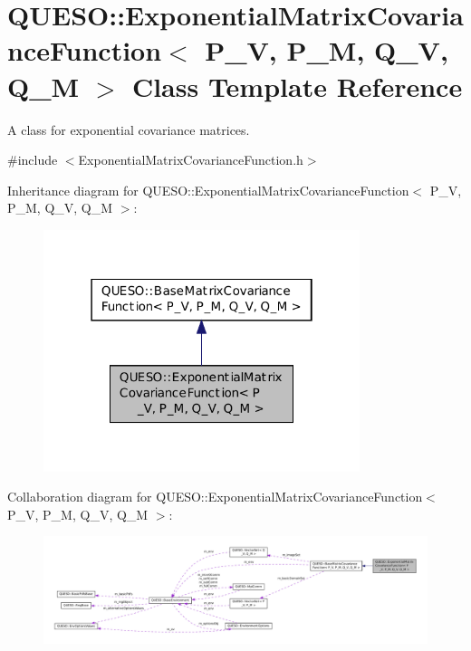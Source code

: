 \hypertarget{class_q_u_e_s_o_1_1_exponential_matrix_covariance_function}{\section{Q\-U\-E\-S\-O\-:\-:Exponential\-Matrix\-Covariance\-Function$<$ P\-\_\-\-V, P\-\_\-\-M, Q\-\_\-\-V, Q\-\_\-\-M $>$ Class Template Reference}
\label{class_q_u_e_s_o_1_1_exponential_matrix_covariance_function}
}


A class for exponential covariance matrices.  




{\ttfamily \#include $<$Exponential\-Matrix\-Covariance\-Function.\-h$>$}



Inheritance diagram for Q\-U\-E\-S\-O\-:\-:Exponential\-Matrix\-Covariance\-Function$<$ P\-\_\-\-V, P\-\_\-\-M, Q\-\_\-\-V, Q\-\_\-\-M $>$\-:
\nopagebreak
\begin{figure}[H]
\begin{center}
\leavevmode
\includegraphics[width=262pt]{class_q_u_e_s_o_1_1_exponential_matrix_covariance_function__inherit__graph}
\end{center}
\end{figure}


Collaboration diagram for Q\-U\-E\-S\-O\-:\-:Exponential\-Matrix\-Covariance\-Function$<$ P\-\_\-\-V, P\-\_\-\-M, Q\-\_\-\-V, Q\-\_\-\-M $>$\-:
\nopagebreak
\begin{figure}[H]
\begin{center}
\leavevmode
\includegraphics[width=350pt]{class_q_u_e_s_o_1_1_exponential_matrix_covariance_function__coll__graph}
\end{center}
\end{figure}
